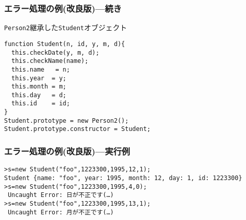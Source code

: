 \begin{frame}[containsverbatim]
 \frametitle{エラー処理の例(改良版)---続き}
\texttt{Person2}継承した\texttt{Student}オブジェクト
\begin{Verbatim}
function Student(n, id, y, m, d){
  this.checkDate(y, m, d);
  this.checkName(name);
  this.name   = n;
  this.year  = y;
  this.month = m;
  this.day   = d;
  this.id    = id;
}
Student.prototype = new Person2();
Student.prototype.constructor = Student;
\end{Verbatim}
\end{frame}
\begin{frame}[containsverbatim]
 \frametitle{エラー処理の例(改良版)---実行例}
\begin{Verbatim}
>s=new Student("foo",1223300,1995,12,1);
Student {name: "foo", year: 1995, month: 12, day: 1, id: 1223300}
>s=new Student("foo",1223300,1995,4,0);
 Uncaught Error: 日が不正です(…)
>s=new Student("foo",1223300,1995,13,1);
 Uncaught Error: 月が不正です(…)
\end{Verbatim}
\end{frame}
